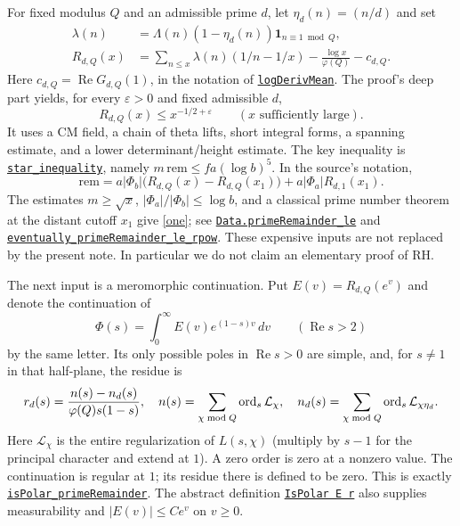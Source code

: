 \documentclass[11pt]{article}
\theoremstyle{remark}\newtheorem{remark}[theorem]{Remark}
\newcommand{\Rea}{\operatorname{Re}}\newcommand{\abs}[1]{\left|#1\right|}
\newcommand{\repo}{https://github.com/VladimirReshetnikov/ProveIt/blob/ef7d441dcb37ea944b7ac15731bb766f2e1354ea/Analysis/GeneralizedRiemannHypothesis/}
\newcommand{\src}[3]{\href{\repo Lean/grh/src/#1.lean\#L#2}{#3}}
\begin{document}
For fixed modulus $Q$ and an admissible prime $d$, let $\eta_d(n)=(n/d)$ and set
\begin{align*}
 \lambda(n)&=\Lambda(n)(1-\eta_d(n))\mathbf1_{n\equiv1\bmod Q},\\
 R_{d,Q}(x)&=\sum_{n\le x}\lambda(n)(1/n-1/x)-\frac{\log x}{\varphi(Q)}-c_{d,Q}.
\end{align*}
Here $c_{d,Q}=\Rea G_{d,Q}(1)$, in the notation of \src{New/Reduction/Zeros/PrimeError}{56}{\texttt{logDerivMean}}. The proof's deep part yields, for every $\varepsilon>0$ and fixed admissible $d$,
\begin{equation}\label{one}
 R_{d,Q}(x)\le x^{-1/2+\varepsilon}\qquad(x\text{ sufficiently large}).
\end{equation}
It uses a CM field, a chain of theta lifts, short integral forms, a spanning estimate, and a lower determinant/height estimate. The key inequality is \src{New/Reduction/MainInequality}{87}{\texttt{star\_inequality}}, namely $m\,\mathrm{rem}\le fa(\log b)^5$. In the source's notation,
\[
 \mathrm{rem}=a|\Phi_b|\big(R_{d,Q}(x)-R_{d,Q}(x_1)\big)+a|\Phi_a|R_{d,1}(x_1).
\]
The estimates $m\ge\sqrt{x}$, $|\Phi_a|/|\Phi_b|\le\log b$, and a classical prime number theorem at the distant cutoff $x_1$ give \eqref{one}; see \src{New/Reduction/OneSidedBound}{33}{\texttt{Data.primeRemainder\_le}} and \src{New/Reduction/OneSidedBound}{200}{\texttt{eventually\_primeRemainder\_le\_rpow}}. These expensive inputs are not replaced by the present note. In particular we do not claim an elementary proof of RH.

The next input is a meromorphic continuation. Put $E(v)=R_{d,Q}(e^v)$ and denote the continuation of
\begin{equation}\label{phi}
 \Phi(s)=\int_0^\infty E(v)e^{(1-s)v}\,dv\qquad(\Rea s>2)
\end{equation}
by the same letter. Its only possible poles in $\Rea s>0$ are simple, and, for $s\ne1$ in that half-plane, the residue is
\begin{equation}\label{residue}
 r_d(s)=\frac{n(s)-n_d(s)}{\varphi(Q)s(1-s)},\quad
 n(s)=\sum_{\chi\bmod Q}\operatorname{ord}_s\mathcal L_\chi,\quad
 n_d(s)=\sum_{\chi\bmod Q}\operatorname{ord}_s\mathcal L_{\chi\eta_d}.
\end{equation}
Here $\mathcal L_\chi$ is the entire regularization of $L(s,\chi)$ (multiply by $s-1$ for the principal character and extend at $1$). A zero order is zero at a nonzero value. The continuation is regular at $1$; its residue there is defined to be zero. This is exactly \src{New/Reduction/Zeros/PrimeError}{414}{\texttt{isPolar\_primeRemainder}}. The abstract definition \src{Lib/Analytic/EntireLFunction}{76}{\texttt{IsPolar E r}} also supplies measurability and $|E(v)|\le Ce^v$ on $v\ge0$.
\end{document}

